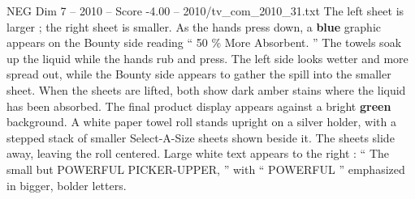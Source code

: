 \begin{textsample}{NEG Dim 7 – 2010 – Score -4.00 – 2010/tv\_com\_2010\_31.txt}
The left sheet is larger ; the right sheet is smaller.
As the hands press down, a \textbf{blue} graphic appears on the Bounty side reading “ 50 \% More Absorbent. ” The towels soak up the liquid while the hands rub and press.
The left side looks wetter and more spread out, while the Bounty side appears to gather the spill into the smaller sheet.
When the sheets are lifted, both show dark amber stains where the liquid has been absorbed.
The final product display appears against a bright \textbf{green} background.
A white paper towel roll stands upright on a silver holder, with a stepped stack of smaller Select-A-Size sheets shown beside it.
The sheets slide away, leaving the roll centered.
Large white text appears to the right : “ The small but POWERFUL PICKER-UPPER, ” with “ POWERFUL ” emphasized in bigger, bolder letters.

\end{textsample}
